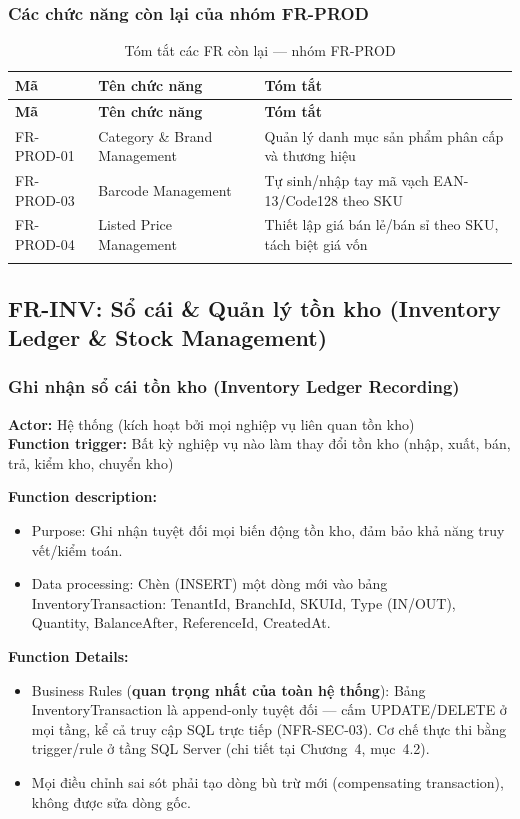 \subsubsection{Các chức năng còn lại của nhóm FR-PROD}

\begin{longtable}{|p{2cm}|p{4.5cm}|p{7cm}|}
    \hline
    \textbf{Mã} & \textbf{Tên chức năng} & \textbf{Tóm tắt} \\
    \hline
    \endfirsthead
    \hline
    \textbf{Mã} & \textbf{Tên chức năng} & \textbf{Tóm tắt} \\
    \hline
    \endhead
    FR-PROD-01 & Category \& Brand Management & Quản lý danh mục sản phẩm phân cấp và thương hiệu \\
    \hline
    FR-PROD-03 & Barcode Management & Tự sinh/nhập tay mã vạch EAN-13/Code128 theo SKU \\
    \hline
    FR-PROD-04 & Listed Price Management & Thiết lập giá bán lẻ/bán sỉ theo SKU, tách biệt giá vốn \\
    \hline
    \caption{Tóm tắt các FR còn lại — nhóm FR-PROD}
\end{longtable}

\subsection{FR-INV: Sổ cái \& Quản lý tồn kho (Inventory Ledger \& Stock Management)}

\subsubsection{Ghi nhận sổ cái tồn kho (Inventory Ledger Recording)}
\textbf{Actor:} Hệ thống (kích hoạt bởi mọi nghiệp vụ liên quan tồn kho) \\
\textbf{Function trigger:} Bất kỳ nghiệp vụ nào làm thay đổi tồn kho (nhập, xuất, bán, trả, kiểm kho, chuyển kho)

\textbf{Function description:}
\begin{itemize}
    \item Purpose: Ghi nhận tuyệt đối mọi biến động tồn kho, đảm bảo khả năng truy vết/kiểm toán.
    \item Data processing: Chèn (INSERT) một dòng mới vào bảng InventoryTransaction: TenantId, BranchId, SKUId, Type (IN/OUT), Quantity, BalanceAfter, ReferenceId, CreatedAt.
\end{itemize}

\textbf{Function Details:}
\begin{itemize}
    \item Business Rules (\textbf{quan trọng nhất của toàn hệ thống}): Bảng InventoryTransaction là append-only tuyệt đối — cấm UPDATE/DELETE ở mọi tầng, kể cả truy cập SQL trực tiếp (NFR-SEC-03). Cơ chế thực thi bằng trigger/rule ở tầng SQL Server (chi tiết tại Chương~4, mục~4.2).
    \item Mọi điều chỉnh sai sót phải tạo dòng bù trừ mới (compensating transaction), không được sửa dòng gốc.
\end{itemize}

